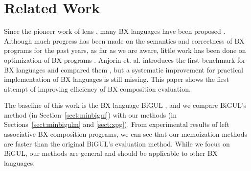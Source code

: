 \section{Related Work} \label{sect:related}


Since the pioneer work of lens \cite{Foster:2007:CBT:1232420.1232424}, many BX languages have been proposed \cite{Bohannon06relationallenses:, Bohannon:2008:BRL:1328438.1328487,Buchmann:2018:BFI:3362232.3362263,Ko:2016:BFV:2847538.2847544,LeblebiciAS14,Samimi-Dehkordi18,Cicchetti2011,Hinkel:2019:CPB:3318595.3318634}.
Although much progress has been made on the semantics and correctness of BX programs for the past years, as far as we are aware, little work has been done on optimization of BX programs \cite{Horn:2018:IRL:3243631.3236769}. Anjorin et. al. introduces the first benchmark for BX languages and compared them \cite{Anjorin2019}, but a systematic improvement for practical implementation of BX languages is still missing. This paper shows the first attempt of improving efficiency of BX composition evaluation.

The baseline of this work is the BX language BiGUL \cite{Ko:2016:BFV:2847538.2847544, Ko:2017:ABB:3177123.3158129}, and we compare BiGUL's method (in Section~\ref{sect:minbigul}) with our methods (in Sections~\ref{sect:minbigulm} and \ref{sect:xpg}). From experimental results of left associative BX composition programs, we can see that our memoization methods are faster than the original BiGUL's evaluation method.
While we focus on BiGUL, our methods are general and should be applicable to other BX languages.



